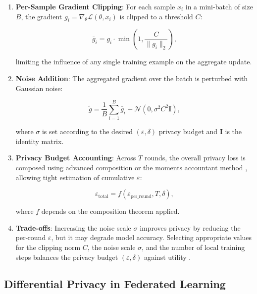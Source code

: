 \begin{enumerate}
    \item \textbf{Per-Sample Gradient Clipping}: For each sample $x_i$ in a 
    mini-batch of size $B$, the gradient $g_i = \nabla_\theta \mathcal{L}(\theta, x_i)$ 
    is clipped to a threshold $C$:

    \begin{equation}
        \bar{g}_i = g_i \cdot \min \left(1, \frac{C}{\| g_i \|_2} \right),
    \end{equation}

    limiting the influence of any single training example on the aggregate update.

    \item \textbf{Noise Addition}: The aggregated gradient over the batch is 
    perturbed with Gaussian noise:

    \begin{equation}
        \tilde{g} = \frac{1}{B} \sum_{i=1}^{B} \bar{g}_i + \mathcal{N}\left(0, \sigma^2 C^2 \mathbf{I}\right),
    \end{equation}

    where $\sigma$ is set according to the desired $(\varepsilon, \delta)$ privacy 
    budget and $\mathbf{I}$ is the identity matrix.

    \item \textbf{Privacy Budget Accounting}: Across $T$ rounds, the overall privacy 
    loss is composed using advanced composition \cite{dwork2014algorithmic} or 
    the moments accountant method \cite{abadi2016deep}, allowing tight estimation 
    of cumulative $\varepsilon$:

    \begin{equation}
        \varepsilon_\text{total} = f(\varepsilon_\text{per\_round}, T, \delta),
    \end{equation}

    where $f$ depends on the composition theorem applied.
    
    \item \textbf{Trade-offs}: Increasing the noise scale $\sigma$ improves 
    privacy by reducing the per-round $\varepsilon$, but it may degrade model 
    accuracy. Selecting appropriate values for the clipping norm $C$, the noise 
    scale $\sigma$, and the number of local training steps balances the privacy 
    budget $(\varepsilon, \delta)$ against utility \cite{geyer2017differentially}.
\end{enumerate}

\subsection{Differential Privacy in Federated Learning}
\label{subsec:dp_in_fl}

